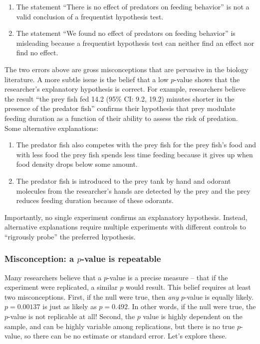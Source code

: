 \documentclass[]{book}
\providecommand{\tightlist}{%
  \setlength{\itemsep}{0pt}\setlength{\parskip}{0pt}}
\begin{document}
\begin{enumerate}
\def\labelenumi{\arabic{enumi}.}
\tightlist
\item
  The statement ``There is no effect of predators on feeding behavior''
  is not a valid conclusion of a frequentist hypothesis test.
\item
  The statement ``We found no effect of predators on feeding behavior''
  is misleading because a frequentist hypothesis test can neither find
  an effect nor find no effect.
\end{enumerate}

The two errors above are gross misconceptions that are pervasive in the
biology literature. A more subtle issue is the belief that a low
\(p\)-value shows that the researcher's explanatory hypothesis is
correct. For example, researchers believe the result ``the prey fish fed
14.2 (95\% CI: 9.2, 19.2) minutes shorter in the presence of the
predator fish'' confirms their hypothesis that prey modulate feeding
duration as a function of their ability to assess the risk of predation.
Some alternative explanations:

\begin{enumerate}
\def\labelenumi{\arabic{enumi}.}
\tightlist
\item
  The predator fish also competes with the prey fish for the prey fish's
  food and with less food the prey fish spends less time feeding because
  it gives up when food density drops below some amount.
\item
  The predator fish is introduced to the prey tank by hand and odorant
  molecules from the researcher's hands are detected by the prey and the
  prey reduces feeding duration because of these odorants.
\end{enumerate}

Importantly, no single experiment confirms an explanatory hypothesis.
Instead, alternative explanations require multiple experiments with
different controls to ``rigrously probe'' the preferred hypothesis.

\subsubsection{\texorpdfstring{Misconception: a \(p\)-value is
repeatable}{Misconception: a p-value is repeatable}}\label{misconception-a-p-value-is-repeatable}

Many researchers believe that a \(p\)-value is a precise measure -- that
if the experiment were replicated, a similar \(p\) would result. This
belief requires at least two misconceptions. First, if the null were
true, then \emph{any} \(p\)-value is equally likely. \(p=0.00137\) is
just as likely as \(p=0.492\). In other words, if the null were true,
the \(p\)-value is not replicable at all! Second, the \(p\) value is
highly dependent on the sample, and can be highly variable among
replications, but there is no true \(p\)-value, so there can be no
estimate or standard error. Let's explore these.
\end{document}
